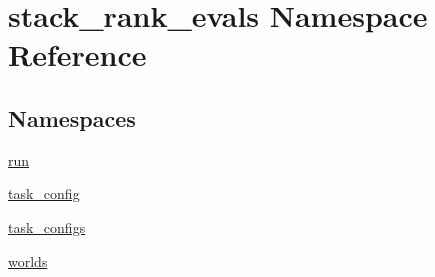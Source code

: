 \hypertarget{namespacestack__rank__evals}{}\section{stack\+\_\+rank\+\_\+evals Namespace Reference}
\label{namespacestack__rank__evals}
\subsection*{Namespaces}
\begin{DoxyCompactItemize}
\item 
 \hyperlink{namespacestack__rank__evals_1_1run}{run}
\item 
 \hyperlink{namespacestack__rank__evals_1_1task__config}{task\+\_\+config}
\item 
 \hyperlink{namespacestack__rank__evals_1_1task__configs}{task\+\_\+configs}
\item 
 \hyperlink{namespacestack__rank__evals_1_1worlds}{worlds}
\end{DoxyCompactItemize}
